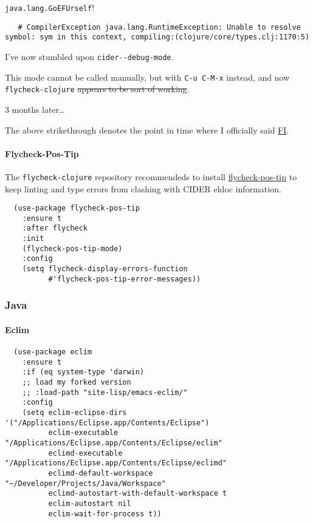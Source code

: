 \documentclass[11pt]{article}
\begin{document}
\texttt{java.lang.GoEFUrself}!

\begin{verbatim}
   # CompilerException java.lang.RuntimeException: Unable to resolve symbol: sym in this context, compiling:(clojure/core/types.clj:1170:5)
\end{verbatim}

I've now stumbled upon \texttt{cider-{}-debug-mode}.

This mode cannot be called manually, but with \texttt{C-u C-M-x} instead,
and now \texttt{flycheck-clojure} \sout{appears to be sort of working}.

3 months later\ldots{}

The above strikethrough denotes the point in time where I officially
said \href{https://www.si.com/nba/2017/05/16/steve-kerr-sneakers-message}{FI}.

\paragraph*{Flycheck-Pos-Tip}
\label{sec:org1fd11dc}

The \texttt{flycheck-clojure} repository recommendeds to install
\href{https://github.com/flycheck/flycheck-pos-tip}{flycheck-pos-tip} to keep linting and type errors from clashing with
CIDER eldoc information.

\begin{verbatim}
  (use-package flycheck-pos-tip
    :ensure t
    :after flycheck
    :init
    (flycheck-pos-tip-mode)
    :config
    (setq flycheck-display-errors-function
          #'flycheck-pos-tip-error-messages))
\end{verbatim}

\subsubsection*{Java}
\label{sec:org3034dcb}
\paragraph*{Eclim}
\label{sec:org88b9eb3}

\begin{verbatim}
  (use-package eclim
    :ensure t
    :if (eq system-type 'darwin)
    ;; load my forked version
    ;; :load-path "site-lisp/emacs-eclim/"
    :config
    (setq eclim-eclipse-dirs '("/Applications/Eclipse.app/Contents/Eclipse")
          eclim-executable "/Applications/Eclipse.app/Contents/Eclipse/eclim"
          eclimd-executable "/Applications/Eclipse.app/Contents/Eclipse/eclimd"
          eclimd-default-workspace "~/Developer/Projects/Java/Workspace"
          eclimd-autostart-with-default-workspace t
          eclim-autostart nil
          eclim-wait-for-process t))
\end{verbatim}
\end{document}
